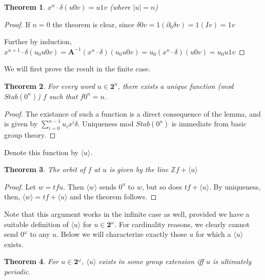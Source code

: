 \documentclass[12pt]{article}
\newcommand{\Z}{\mathbb{Z}}
\newcommand{\2}{\textbf{2}}
\newcommand{\Am}{\textbf{A}}
\newcommand{\del}{\partial}
\newtheorem{thm}{Theorem}
\begin{document}
\begin{thm}
  $x^n \cdot \delta (u0v) = u1v$ (where $|u| = n$)
\end{thm}

\begin{proof}
  If $n=0$ the theorem is clear, since 
  $\delta 0v = 1 (\del_0 \delta v) = 1 (I v) = 1v$

  Further by induction, 
  $x^{n+1} \cdot \delta (u_0u0v) = 
  \Am^{-1} (x^n \cdot \delta) (u_0u0v) =
  u_0 (x^n \cdot \delta) (u0v) =
  u_0u1v$
\end{proof}

We will first prove the result in the finite case.

\begin{thm}
  For every word $u \in \2^n$, there exists a unique function
  (mod $Stab(0^n)$) $f$ such that $f 0^n = u$.
\end{thm}

\begin{proof}
  The existance of such a function is a direct consequence of the lemma,
  and is given by $\sum_{i=0}^{n-1} u_i x^i \delta$.
  Uniqueness mod $Stab(0^n)$ is immediate from basic group theory.
\end{proof}

Denote this function by $\langle u \rangle$. 

\begin{thm}
  The orbit of $f$ at $u$ is given by the line $\Z f + \langle u \rangle$
\end{thm}

\begin{proof}
  Let $w = tf u$. Then $\langle w \rangle$ sends $0^n$ to $w$, 
  but so does $tf + \langle u \rangle$. By uniqueness, then,
  $\langle w \rangle = tf + \langle u \rangle$ and the theorem follows.
\end{proof}

Note that this argument works in the infinite case as well, provided 
we have a suitable definition of $\langle u \rangle$ for $u \in \2^\omega$.
For cardinality reasons, we clearly cannot send $0^\omega$ to any $u$.
Below we will characterize exactly those $u$ for which a $\langle u \rangle$
exists.

\begin{thm}
  For $u \in \2^\omega$, $\langle u \rangle$ exists in some group extension
  iff $u$ is ultimately periodic.
\end{thm}
\end{document}
